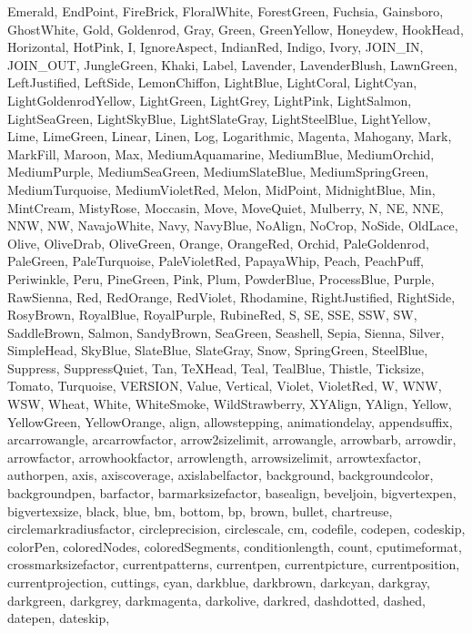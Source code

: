 {{  Emerald, EndPoint, FireBrick, FloralWhite, ForestGreen, Fuchsia, Gainsboro,
  GhostWhite, Gold, Goldenrod, Gray, Green, GreenYellow, Honeydew, HookHead,
  Horizontal, HotPink, I, IgnoreAspect, IndianRed, Indigo, Ivory, JOIN_IN,
  JOIN_OUT, JungleGreen, Khaki, Label, Lavender, LavenderBlush, LawnGreen,
  LeftJustified, LeftSide, LemonChiffon, LightBlue, LightCoral, LightCyan,
  LightGoldenrodYellow, LightGreen, LightGrey, LightPink, LightSalmon,
  LightSeaGreen, LightSkyBlue, LightSlateGray, LightSteelBlue, LightYellow,
  Lime, LimeGreen, Linear, Linen, Log, Logarithmic, Magenta, Mahogany, Mark,
  MarkFill, Maroon, Max, MediumAquamarine, MediumBlue, MediumOrchid,
  MediumPurple, MediumSeaGreen, MediumSlateBlue, MediumSpringGreen,
  MediumTurquoise, MediumVioletRed, Melon, MidPoint, MidnightBlue, Min,
  MintCream, MistyRose, Moccasin, Move, MoveQuiet, Mulberry, N, NE, NNE, NNW,
  NW, NavajoWhite, Navy, NavyBlue, NoAlign, NoCrop, NoSide, OldLace, Olive,
  OliveDrab, OliveGreen, Orange, OrangeRed, Orchid, PaleGoldenrod, PaleGreen,
  PaleTurquoise, PaleVioletRed, PapayaWhip, Peach, PeachPuff, Periwinkle, Peru,
  PineGreen, Pink, Plum, PowderBlue, ProcessBlue, Purple, RawSienna, Red,
  RedOrange, RedViolet, Rhodamine, RightJustified, RightSide, RosyBrown,
  RoyalBlue, RoyalPurple, RubineRed, S, SE, SSE, SSW, SW, SaddleBrown, Salmon,
  SandyBrown, SeaGreen, Seashell, Sepia, Sienna, Silver, SimpleHead, SkyBlue,
  SlateBlue, SlateGray, Snow, SpringGreen, SteelBlue, Suppress, SuppressQuiet,
  Tan, TeXHead, Teal, TealBlue, Thistle, Ticksize, Tomato, Turquoise, VERSION,
  Value, Vertical, Violet, VioletRed, W, WNW, WSW, Wheat, White, WhiteSmoke,
  WildStrawberry, XYAlign, YAlign, Yellow, YellowGreen, YellowOrange, align,
  allowstepping, animationdelay, appendsuffix, arcarrowangle, arcarrowfactor,
  arrow2sizelimit, arrowangle, arrowbarb, arrowdir, arrowfactor,
  arrowhookfactor, arrowlength, arrowsizelimit, arrowtexfactor, authorpen,
  axis, axiscoverage, axislabelfactor, background, backgroundcolor,
  backgroundpen, barfactor, barmarksizefactor, basealign, beveljoin,
  bigvertexpen, bigvertexsize, black, blue, bm, bottom, bp, brown, bullet,
  chartreuse, circlemarkradiusfactor, circleprecision, circlescale, cm,
  codefile, codepen, codeskip, colorPen, coloredNodes, coloredSegments,
  conditionlength, count, cputimeformat, crossmarksizefactor, currentpatterns,
  currentpen, currentpicture, currentposition, currentprojection, cuttings,
  cyan, darkblue, darkbrown, darkcyan, darkgray, darkgreen, darkgrey,
  darkmagenta, darkolive, darkred, dashdotted, dashed, datepen, dateskip,
}}
